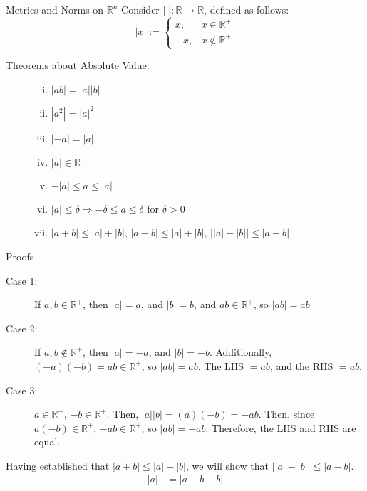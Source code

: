 \documentclass[10pt]{extarticle}
\newcommand{\R}{\mathbb{R}}
\begin{document}
  \begin{problem}{Metrics and Norms on $\R^n$}
    Consider $|\cdot|: \R \rightarrow \R$, defined as follows:
    \[
      |x| := \begin{cases}
        x,&x\in\R^+\\
        -x,&x\notin\R^+
      \end{cases}
    \] 
    \begin{description}
      \item[Theorems about Absolute Value:]\hfill
        \begin{enumerate}[(i)]
          \item $|ab| = |a||b|$
          \item $|a^2| = |a|^2$
          \item $|-a| = |a|$
          \item $|a|\in\R^+$
          \item $-|a| \leq a \leq |a|$
          \item $|a| \leq \delta \Rightarrow -\delta \leq a \leq \delta$ for $\delta > 0$
          \item $|a+b| \leq |a| + |b|$, $|a-b| \leq |a| + |b|$, $\vert|a| - |b|\vert \leq |a-b|$
        \end{enumerate}
    \end{description}
    \begin{problem}{Proofs}
      \begin{description}[font=\normalfont]
        \item[Proof of (i)]\hfill
          \begin{description}
            \item[Case 1:] If $a,b\in\R^+$, then $|a| = a$, and $|b| = b$, and $ab \in \R^+$, so $|ab| = ab$
            \item[Case 2:] If $a,b\notin\R^+$, then $|a| = -a$, and $|b| = -b$. Additionally, $(-a)(-b)=ab \in\R^+$, so $|ab| = ab$. The LHS $=ab$, and the RHS $=ab$.
            \item[Case 3:] $a\in\R^+$, $-b\in\R^+$. Then, $|a||b| = (a)(-b) = -ab$. Then, since $a(-b)\in\R^+$, $-ab\in\R^+$, so $|ab| = -ab$. Therefore, the LHS and RHS are equal.
          \end{description}
        \item[Proof of (vii)] Having established that $|a+b| \leq |a| + |b|$, we will show that $\vert|a| - |b|\vert \leq |a-b|$.
          \begin{align*}
            |a| &= |a-b+b| \\

\end{align*}
\end{description}
\end{problem}
\end{problem}
\end{document}
